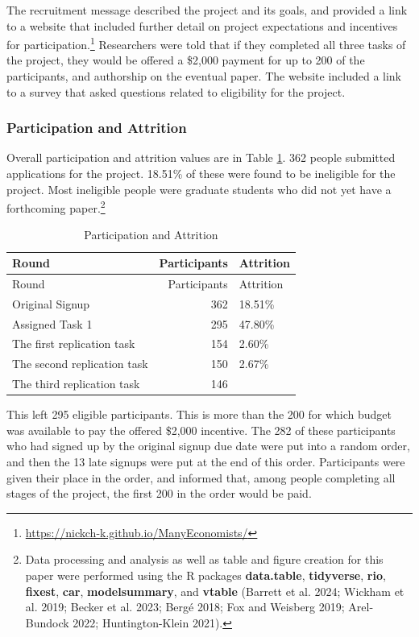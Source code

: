 \documentclass[
  letterpaper,
  DIV=11,
  numbers=noendperiod]{scrartcl}
\begin{document}
The recruitment message described the project and its goals, and
provided a link to a website that included further detail on project
expectations and incentives for participation.\footnote{\url{https://nickch-k.github.io/ManyEconomists/}}
Researchers were told that if they completed all three tasks of the
project, they would be offered a \$2,000 payment for up to 200 of the
participants, and authorship on the eventual paper. The website included
a link to a survey that asked questions related to eligibility for the
project.

\hypertarget{participation-and-attrition}{%
\subsubsection{Participation and
Attrition}\label{participation-and-attrition}}

Overall participation and attrition values are in Table
\ref{tbl-attrition}. 362 people submitted applications for the project.
18.51\% of these were found to be ineligible for the project. Most
ineligible people were graduate students who did not yet have a
forthcoming paper.\footnote{Data processing and analysis as well as
  table and figure creation for this paper were performed using the R
  packages \textbf{data.table}, \textbf{tidyverse}, \textbf{rio},
  \textbf{fixest}, \textbf{car}, \textbf{modelsummary}, and
  \textbf{vtable} (Barrett et al. 2024; Wickham et al. 2019; Becker et
  al. 2023; Bergé 2018; Fox and Weisberg 2019; Arel-Bundock 2022;
  Huntington-Klein 2021).}

\begin{longtable}[]{@{}lrl@{}}
\caption{Participation and
Attrition\label{tbl-attrition}}\tabularnewline
\toprule\noalign{}
Round & Participants & Attrition \\
\midrule\noalign{}
\endfirsthead
\toprule\noalign{}
Round & Participants & Attrition \\
\midrule\noalign{}
\endhead
\bottomrule\noalign{}
\endlastfoot
Original Signup & 362 & 18.51\% \\
Assigned Task 1 & 295 & 47.80\% \\
The first replication task & 154 & 2.60\% \\
The second replication task & 150 & 2.67\% \\
The third replication task & 146 & \\
\end{longtable}

This left 295 eligible participants. This is more than the 200 for which
budget was available to pay the offered \$2,000 incentive. The 282 of
these participants who had signed up by the original signup due date
were put into a random order, and then the 13 late signups were put at
the end of this order. Participants were given their place in the order,
and informed that, among people completing all stages of the project,
the first 200 in the order would be paid.
\end{document}
